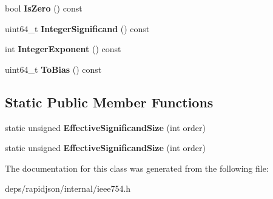 \begin{DoxyCompactItemize}
\item 
bool {\bfseries Is\+Zero} () const \hypertarget{classinternal_1_1_double_a6eb58f2690af582efeb9b76ef35c4c60}{}\label{classinternal_1_1_double_a6eb58f2690af582efeb9b76ef35c4c60}

\item 
uint64\+\_\+t {\bfseries Integer\+Significand} () const \hypertarget{classinternal_1_1_double_a96c5e0f06551e83565b5097950d30e32}{}\label{classinternal_1_1_double_a96c5e0f06551e83565b5097950d30e32}

\item 
int {\bfseries Integer\+Exponent} () const \hypertarget{classinternal_1_1_double_a8e16ee31d521fb56f0b98be427a9d47e}{}\label{classinternal_1_1_double_a8e16ee31d521fb56f0b98be427a9d47e}

\item 
uint64\+\_\+t {\bfseries To\+Bias} () const \hypertarget{classinternal_1_1_double_af8b543dc813f761d274824f7cef00a43}{}\label{classinternal_1_1_double_af8b543dc813f761d274824f7cef00a43}

\end{DoxyCompactItemize}
\subsection*{Static Public Member Functions}
\begin{DoxyCompactItemize}
\item 
static unsigned {\bfseries Effective\+Significand\+Size} (int order)\hypertarget{classinternal_1_1_double_a980c26d006068b23406805e9b0e02588}{}\label{classinternal_1_1_double_a980c26d006068b23406805e9b0e02588}

\item 
static unsigned {\bfseries Effective\+Significand\+Size} (int order)\hypertarget{classinternal_1_1_double_a980c26d006068b23406805e9b0e02588}{}\label{classinternal_1_1_double_a980c26d006068b23406805e9b0e02588}

\end{DoxyCompactItemize}


The documentation for this class was generated from the following file\+:\begin{DoxyCompactItemize}
\item 
deps/rapidjson/internal/ieee754.\+h\end{DoxyCompactItemize}
